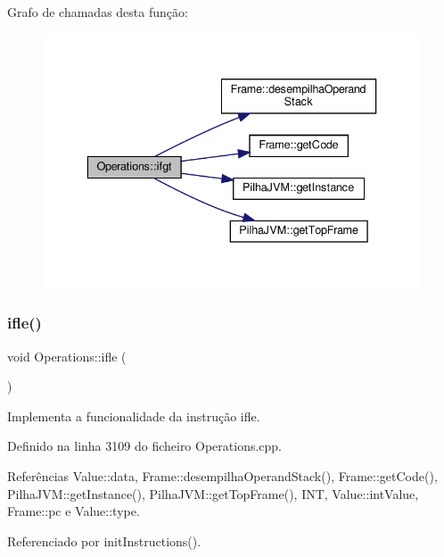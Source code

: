 Grafo de chamadas desta função\+:
\nopagebreak
\begin{figure}[H]
\begin{center}
\leavevmode
\includegraphics[width=336pt]{classOperations_afff52b972f58750ea8037aeb02dd22bc_cgraph}
\end{center}
\end{figure}
\mbox{\label{classOperations_a1ef1754372db2e5285a129389274dcc8}} 
\subsubsection{\texorpdfstring{ifle()}{ifle()}}
{\footnotesize\ttfamily void Operations\+::ifle (\begin{DoxyParamCaption}{ }\end{DoxyParamCaption})\hspace{0.3cm}{\ttfamily [private]}}



Implementa a funcionalidade da instrução ifle. 



Definido na linha 3109 do ficheiro Operations.\+cpp.



Referências Value\+::data, Frame\+::desempilha\+Operand\+Stack(), Frame\+::get\+Code(), Pilha\+J\+V\+M\+::get\+Instance(), Pilha\+J\+V\+M\+::get\+Top\+Frame(), I\+NT, Value\+::int\+Value, Frame\+::pc e Value\+::type.



Referenciado por init\+Instructions().


